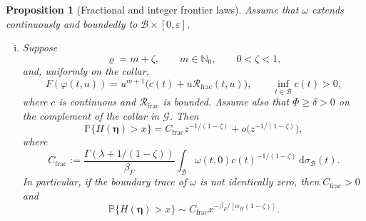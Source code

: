 \documentclass[11pt]{amsart}
\numberwithin{equation}{section}
\newtheorem{proposition}[theorem]{Proposition}
\theoremstyle{definition}
\theoremstyle{remark}
\newcommand{\dd}{\,\mathrm{d}}
\newcommand{\eps}{\varepsilon}
\begin{document}
\begin{proposition}[Fractional and integer frontier laws]
\label{prop:weibull-frontier}
Assume that $\omega$ extends continuously and boundedly to
$\mathcal B\times[0,\eps]$.

\begin{enumerate}[(i)]
\item Suppose
\begin{equation}\label{eq:weibull-fractional-ratio}
 \varrho=m+\zeta,
 \qquad m\in\mathbb N_0,
 \qquad 0<\zeta<1,
\end{equation}
and, uniformly on the collar,
\begin{equation}\label{eq:weibull-fractional-phase}
 F(\varphi(t,u))
 =u^{m+1}\bigl(c(t)+u\mathcal R_{\mathrm{frac}}(t,u)\bigr),
 \qquad
 \inf_{t\in\mathcal B}c(t)>0,
\end{equation}
where $c$ is continuous and $\mathcal R_{\mathrm{frac}}$ is bounded.  Assume also that
$\Phi\ge\delta>0$ on the complement of the collar in $\mathcal G$.  Then
\begin{equation}\label{eq:weibull-fractional-asymptotic}
 \mathbb P\{H(\bm\eta)>x\}
 =C_{\mathrm{frac}}z^{-1/(1-\zeta)}+o\bigl(z^{-1/(1-\zeta)}\bigr),
\end{equation}
where
\begin{equation}\label{eq:weibull-fractional-constant}
 C_{\mathrm{frac}}
 :=\frac{\Gamma(\lambda+1/(1-\zeta))}{\beta_F}
 \int_{\mathcal B}
 \omega(t,0)c(t)^{-1/(1-\zeta)}\dd\sigma_{\mathcal B}(t).
\end{equation}
In particular, if the boundary trace of $\omega$ is not identically zero,
then $C_{\mathrm{frac}}>0$ and
\begin{equation}\label{eq:weibull-fractional-x-form}
 \mathbb P\{H(\bm\eta)>x\}
 \sim C_{\mathrm{frac}}
 x^{-\beta_F/[\alpha_H(1-\zeta)]}.
\end{equation}


\end{enumerate}
\end{proposition}
\end{document}
